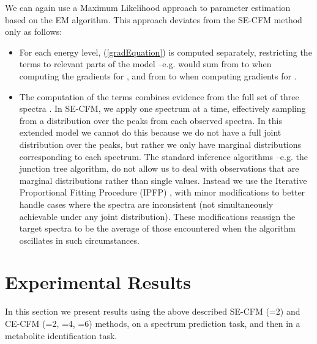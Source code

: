 We can again use a Maximum Likelihood approach to parameter estimation based on the EM algorithm. This approach deviates from the SE-CFM method only as follows:
\begin{itemize}
\item For each energy level, (\ref{gradEquation}) is computed separately, restricting the  terms to relevant parts of the model --e.g.  would sum from  to  when computing the gradients for , and from  to  when computing gradients for .
\item The computation of the  terms combines evidence from the full set of three spectra . In SE-CFM, we apply one spectrum at a time, effectively sampling from a distribution over the peaks from each observed spectra. In this extended model we cannot do this because we do not have a full joint distribution over the peaks, but rather we only have marginal distributions corresponding to each spectrum. 
The standard inference algorithms --e.g. the junction tree algorithm, do not allow us to deal with observations that are marginal distributions rather than single values. Instead we use the Iterative Proportional Fitting Procedure (IPFP) \citep{Stephan1940}, with minor modifications to better handle cases where the spectra are inconsistent (not simultaneously achievable under any joint distribution). These modifications reassign the target spectra to be the average of those encountered when the algorithm oscillates in such circumstances.
\end{itemize}

\section{Experimental Results}
\label{sec:results}

In this section we present results using the above described SE-CFM (=2) and CE-CFM (=2, =4, =6) methods, on a spectrum prediction task, and then in a metabolite identification task. 

